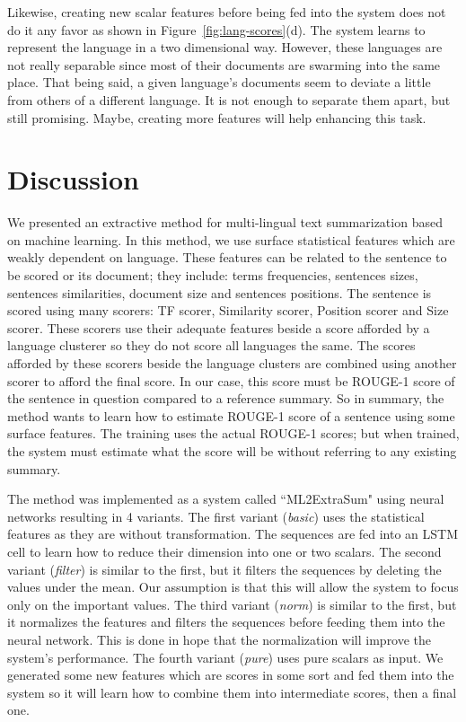 Likewise, creating new scalar features before being fed into the system does not do it any favor as shown in Figure~\ref{fig:lang-scores}(d).
The system learns to represent the language in a two dimensional way.
However, these languages are not really separable since most of their documents are swarming into the same place. 
That being said, a given language's documents seem to deviate a little from others of a different language. 
It is not enough to separate them apart, but still promising. 
Maybe, creating more features will help enhancing this task. 


\section{Discussion}

We presented an extractive method for multi-lingual text summarization based on machine learning. 
In this method, we use surface statistical features which are weakly dependent on language.
These features can be related to the sentence to be scored or its document; they include: terms frequencies, sentences sizes, sentences similarities, document size and sentences positions. 
The sentence is scored using many scorers: TF scorer, Similarity scorer, Position scorer and Size scorer. 
These scorers use their adequate features beside a score afforded by a language clusterer so they do not score all languages the same. 
The scores afforded by these scorers beside the language clusters are combined using another scorer to afford the final score. 
In our case, this score must be ROUGE-1 score of the sentence in question compared to a reference summary. 
So in summary, the method wants to learn how to estimate ROUGE-1 score of a sentence using some surface features. 
The training uses the actual ROUGE-1 scores; but when trained, the system must estimate what the score will be without referring to any existing summary.


The method was implemented as a system called ``ML2ExtraSum" using neural networks resulting in 4 variants. 
The first variant (\textit{basic}) uses the statistical features as they are without transformation. 
The sequences are fed into an LSTM cell to learn how to reduce their dimension into one or two scalars. 
The second variant (\textit{filter}) is similar to the first, but it filters the sequences by deleting the values under the mean. 
Our assumption is that this will allow the system to focus only on the important values. 
The third variant (\textit{norm}) is similar to the first, but it normalizes the features and filters the sequences before feeding them into the neural network. 
This is done in hope that the normalization will improve the system's performance. 
The fourth variant (\textit{pure}) uses pure scalars as input. 
We generated some new features which are scores in some sort and fed them into the system so it will learn how to combine them into intermediate scores, then a final one. 

